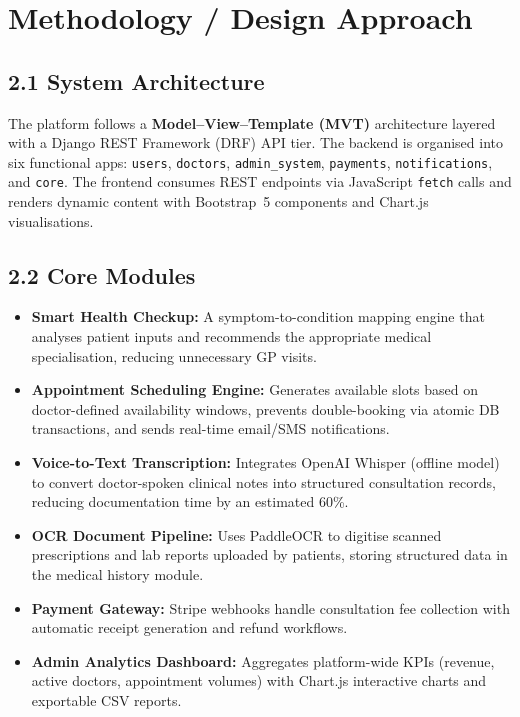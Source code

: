 \documentclass[10pt,twocolumn]{article}
\begin{document}
\section{Methodology / Design Approach}

\subsection*{2.1 System Architecture}
The platform follows a \textbf{Model–View–Template (MVT)} architecture layered with
a Django REST Framework (DRF) API tier. The backend is organised into six functional
apps: \texttt{users}, \texttt{doctors}, \texttt{admin\_system}, \texttt{payments},
\texttt{notifications}, and \texttt{core}. The frontend consumes REST endpoints via
JavaScript \texttt{fetch} calls and renders dynamic content with Bootstrap~5 components
and Chart.js visualisations.

\subsection*{2.2 Core Modules}

\begin{itemize}[leftmargin=1em, topsep=2pt, itemsep=1pt]
  \item \textbf{Smart Health Checkup:} A symptom-to-condition mapping engine that
        analyses patient inputs and recommends the appropriate medical specialisation,
        reducing unnecessary GP visits.
  \item \textbf{Appointment Scheduling Engine:} Generates available slots based on
        doctor-defined availability windows, prevents double-booking via atomic DB
        transactions, and sends real-time email/SMS notifications.
  \item \textbf{Voice-to-Text Transcription:} Integrates OpenAI Whisper (offline
        model) to convert doctor-spoken clinical notes into structured consultation
        records, reducing documentation time by an estimated 60\%.
  \item \textbf{OCR Document Pipeline:} Uses PaddleOCR to digitise scanned
        prescriptions and lab reports uploaded by patients, storing structured data
        in the medical history module.
  \item \textbf{Payment Gateway:} Stripe webhooks handle consultation fee collection
        with automatic receipt generation and refund workflows.
  \item \textbf{Admin Analytics Dashboard:} Aggregates platform-wide KPIs (revenue,
        active doctors, appointment volumes) with Chart.js interactive charts and
        exportable CSV reports.
\end{itemize}
\end{document}
